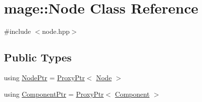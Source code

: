 \hypertarget{classmage_1_1_node}{}\section{mage\+:\+:Node Class Reference}
\label{classmage_1_1_node}


{\ttfamily \#include $<$node.\+hpp$>$}

\subsection*{Public Types}
\begin{DoxyCompactItemize}
\item 
using \mbox{\hyperlink{classmage_1_1_node_ac575dc006e0ae1134277ade977dc06b6}{Node\+Ptr}} = \mbox{\hyperlink{classmage_1_1_proxy_ptr}{Proxy\+Ptr}}$<$ \mbox{\hyperlink{classmage_1_1_node}{Node}} $>$
\item 
using \mbox{\hyperlink{classmage_1_1_node_a46b7e1f4f5b98bfa78ed96a80797a4ba}{Component\+Ptr}} = \mbox{\hyperlink{classmage_1_1_proxy_ptr}{Proxy\+Ptr}}$<$ \mbox{\hyperlink{classmage_1_1_component}{Component}} $>$
\end{DoxyCompactItemize}
